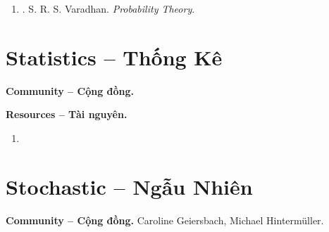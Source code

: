 \documentclass{article}
\begin{document}
\begin{enumerate}
\begin{itemize}
\begin{itemize}
			\item {. Poisson--Dirichlet Distribution.}
		\end{itemize}
		\item {. It\^o Integral.}
		\begin{itemize}
			\item {. I\^o Integral w.r.t. Brownian Motion.}
			\item {. I\^o Integral w.r.t. Diffusions.}
			\item {. It\^o Formula.}
			\item {. Dirichlet Problem \& Brownian Motion.}
			\item {. Recurrence \& Transience of Brownian Motion.}
		\end{itemize}
		\item {. Stochastic Differential Equations.}
		\begin{itemize}
			\item {. Strong Solutions.}
			\item {. Weak Solutions \& Martingale Problem.}
			\item {. Weak Uniqueness via Duality.}
		\end{itemize}
	\end{itemize}
	
	\item \cite{Varadhan2001}. {\sc S. R. S. Varadhan}. {\it Probability Theory}.
\end{enumerate}


\section{Statistics -- Thống Kê}
\textbf{\textsf{Community -- Cộng đồng.}} 

\noindent\textbf{\textsf{Resources -- Tài nguyên.}}
\begin{enumerate}
	\item 
\end{enumerate}


\section{Stochastic -- Ngẫu Nhiên}
\textbf{\textsf{Community -- Cộng đồng.}} {\sc Caroline Geiersbach}, {\sc Michael Hinterm\"uller}.
\end{document}

